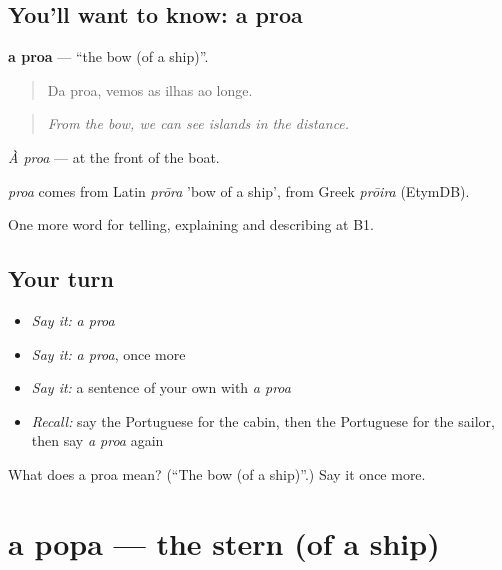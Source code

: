 \subsection*{You'll want to know: a proa}
\textbf{a proa} — \textquotedblleft{}the bow (of a ship)\textquotedblright{}.

\begin{quote}
Da proa, vemos as ilhas ao longe.
\end{quote}

\begin{quote}
\emph{From the bow, we can see islands in the distance.}
\end{quote}

\emph{À proa} — at the front of the boat.

\begin{cousinweb}
\emph{proa} comes from Latin \emph{prōra} 'bow of a ship', from Greek \emph{prōira} (EtymDB).
\end{cousinweb}

\begin{grammarlens}[title={What you've built}]
One more word for telling, explaining and describing at B1.
\end{grammarlens}

\subsection*{Your turn}
\begin{itemize}
\raggedright
  \item \emph{Say it:} \emph{a proa}
  \item \emph{Say it:} \emph{a proa}, once more
  \item \emph{Say it:} a sentence of your own with \emph{a proa}
  \item \emph{Recall:} say the Portuguese for the cabin, then the Portuguese for the sailor, then say \emph{a proa} again
\end{itemize}

\begin{tcolorbox}[breakable,colback=teal!4,colframe=teal!35!black,title={Before you move on}]
What does a proa mean? (\textquotedblleft{}The bow (of a ship)\textquotedblright{}.) Say it once more.
\end{tcolorbox}
\section[a popa]{a popa — the stern (of a ship)}

